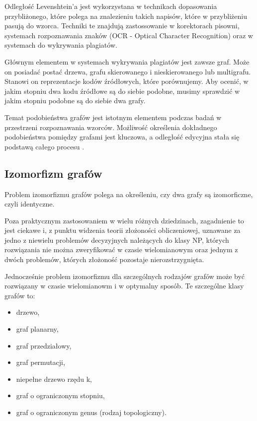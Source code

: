 \documentclass[a4paper,12pt,twoside]{article}
\begin{document}
Odległość Levenshtein'a jest wykorzystana w technikach dopasowania przybliżonego, które polega na znalezieniu takich napisów, które w przybliżeniu pasują do wzorca. Techniki te znajdują zastossowanie w korektorach pisowni, systemach rozpoznawania znaków  (OCR - Optical Character Recognition) oraz w systemach do wykrywania plagiatów.

Głównym elementem w systemach wykrywania plagiatów jest zawsze graf. Może on posiadać postać drzewa, grafu skierowanego i nieskierowanego lub multigrafu. Stanowi on reprezentacje kodów źródłowych, które porównujemy. Aby ocenić, w jakim stopniu dwa kodu źródłowe są do siebie podobne, musimy sprawdzić w jakim stopniu podobne są do siebie dwa grafy.

Temat podobieństwa grafów jest istotnym elementem podczas badań w przestrzeni rozpoznawania wzorców. Możliwość określenia dokładnego podobieństwa pomiędzy grafami jest kluczowa, a odległość edycyjna stała się podstawą całego procesu \cite{ged}.

\newpage

\subsection{Izomorfizm grafów}

Problem izomorfizmu grafów polega na określeniu, czy dwa grafy są izomorficzne, czyli identyczne.

Poza praktycznym zastosowaniem w wielu różnych dziedzinach, zagadnienie to jest ciekawe i, z punktu widzenia teorii złożoności obliczeniowej, uznawane za jedno z niewielu problemów decyzyjnych należących do klasy NP, których rozwiązania nie można zweryfikować w czasie wielomianowym oraz jednym z dwóch problemów, których złożoność pozostaje nierozstrzygnięta\cite{np}.

Jednocześnie problem izomorfizmu dla szczególnych rodzajów grafów może być rozwiązany w czasie wielomianowm i w optymalny sposób. Te szczególne klasy grafów to:
\begin{itemize}
\item drzewo\cite{iso_tree},
\item graf planarny\cite{iso_planar},
\item graf przedziałowy\cite{iso_interval},
\item graf permutacji\cite{iso_perm},
\item niepełne drzewo rzędu k\cite{iso_ktree},
\item graf o ograniczonym stopniu\cite{iso_degree},
\item graf o ograniczonym genus (rodzaj topologiczny)\cite{iso_genus}.
\end{itemize}
\end{document}
